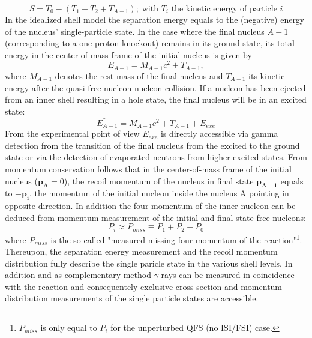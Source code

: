 \begin{equation}
S = T_0 -(T_1+T_2 +T_{A-1}); \; \text{with $T_i$ the kinetic energy of particle $i$} 
\label{eq:sep_e}
\end{equation}
In the idealized shell model the separation energy equals to the (negative) energy of the nucleus' single-particle state. In the case where the final nucleus \( A-1 \) (corresponding to a one-proton knockout) remains in its ground state, its total energy in the center-of-mass frame of the initial nucleus is given by
\begin{equation}
E_{A-1} = M_{A-1}c^{2} + T_{A-1},
\end{equation}
where \( M_{A-1} \) denotes the rest mass of the final nucleus and \( T_{A-1} \) its kinetic energy after the quasi-free nucleon-nucleon collision.\newline
If a nucleon has been ejected from an inner shell resulting in a hole state, the final nucleus will be in an excited state:
\begin{equation}
E^{*}_{A-1} =  M_{A-1}c^2  +T_{A-1} + E_{exe}
\end{equation} 
From the experimental point of view $E_{exe}$ is directly accessible via gamma detection from the transition of the final nucleus from the excited to the ground state or via the detection of evaporated neutrons from higher excited states.\newline
From momentum conservation follows that in the center-of-mass frame of the initial nucleus ($\mathbf{p_A} = 0$), the recoil momentum of the nucleus in final state $\mathbf{p_{A-1}}$ equals to $-\mathbf{p_i}$, the momentum of the initial nucleon inside the nucleus A pointing in opposite direction. \newline
In addition the four-momentum of the inner nucleon can be deduced from momentum measurement of the initial and final state free nucleons:
\begin{equation}\label{eq:miss_mom}
P_i \approx P_{miss} \equiv P_1 + P_2  - P_0
\end{equation}
where $P_{miss}$ is the so called "measured missing four-momentum of the reaction"\cite{patsyuk2021unperturbed}\footnote{$P_{miss}$ is only equal to $P_i$ for the unperturbed QFS (no ISI/FSI) case.}.
Thereupon, the separation energy measurement and the recoil momentum distribution fully describe the single paricle state in the various shell levels. 
In addition and as complementary method $\gamma$ rays can be measured in coincidence with the reaction and consequentely exclusive cross section and momentum distribution measurements of the single particle states are accessible.\newline
